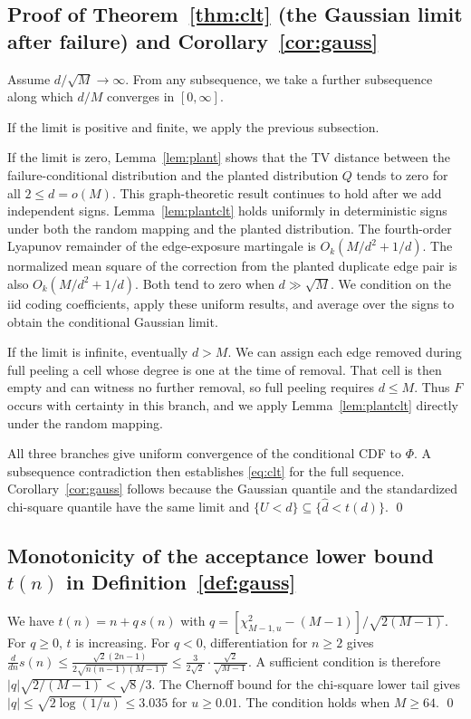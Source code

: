 \subsection{\texorpdfstring{Proof of Theorem~\ref{thm:clt} (the Gaussian limit after failure) and Corollary~\ref{cor:gauss}}{Proof of the Gaussian limit after failure and the Gaussian rule}}
Assume $d/\sqrt M\to\infty$. From any subsequence, we take a further subsequence along which $d/M$ converges in $[0,\infty]$.

If the limit is positive and finite, we apply the previous subsection.

If the limit is zero, Lemma~\ref{lem:plant} shows that the TV distance between the failure-conditional distribution and the planted distribution $Q$ tends to zero for all $2\le d=o(M)$. This graph-theoretic result continues to hold after we add independent signs. Lemma~\ref{lem:plantclt} holds uniformly in deterministic signs under both the random mapping and the planted distribution. The fourth-order Lyapunov remainder of the edge-exposure martingale is $O_k(M/d^2+1/d)$. The normalized mean square of the correction from the planted duplicate edge pair is also $O_k(M/d^2+1/d)$. Both tend to zero when $d\gg\sqrt M$. We condition on the iid coding coefficients, apply these uniform results, and average over the signs to obtain the conditional Gaussian limit.

If the limit is infinite, eventually $d>M$. We can assign each edge removed during full peeling a cell whose degree is one at the time of removal. That cell is then empty and can witness no further removal, so full peeling requires $d\le M$. Thus $F$ occurs with certainty in this branch, and we apply Lemma~\ref{lem:plantclt} directly under the random mapping.

All three branches give uniform convergence of the conditional CDF to $\Phi$. A subsequence contradiction then establishes \eqref{eq:clt} for the full sequence. Corollary~\ref{cor:gauss} follows because the Gaussian quantile and the standardized chi-square quantile have the same limit and $\{U<d\}\subseteq\{\widehat d<t(d)\}$. \qed

\subsection{\texorpdfstring{Monotonicity of the acceptance lower bound $t(n)$ in Definition~\ref{def:gauss}}{Monotonicity of the acceptance lower bound of the Gaussian rule}}\label{app:gauss-mono}
We have $t(n)=n+q\,s(n)$ with $q=[\chi^2_{M-1,u}-(M-1)]/\sqrt{2(M-1)}$. For $q\ge0$, $t$ is increasing. For $q<0$, differentiation for $n\ge2$ gives $\frac{d}{dn}s(n)\le\frac{\sqrt2(2n-1)}{2\sqrt{n(n-1)(M-1)}}\le\frac{3}{2\sqrt2}\cdot\frac{\sqrt2}{\sqrt{M-1}}$. A sufficient condition is therefore $|q|\sqrt{2/(M-1)}<\sqrt8/3$. The Chernoff bound for the chi-square lower tail \cite[Lemma~1]{laurent2000adaptive} gives $|q|\le\sqrt{2\log(1/u)}\le3.035$ for $u\ge0.01$. The condition holds when $M\ge64$. \qed
